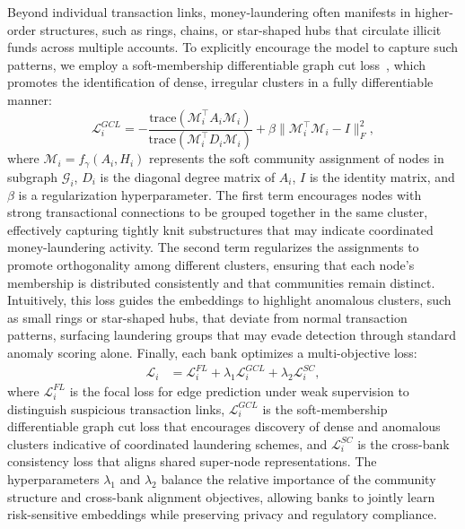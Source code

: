 \documentclass[11pt,english]{article}
\begin{document}
Beyond individual transaction links, money-laundering often manifests in higher-order structures, such as rings, chains, or star-shaped hubs that circulate illicit funds across multiple accounts. To explicitly encourage the model to capture such patterns, we employ a soft-membership differentiable graph cut loss~\parencite{nazi2019gap}, which promotes the identification of dense, irregular clusters in a fully differentiable manner:
\begin{equation}
\mathcal{L}_i^{GCL} = -\frac{\mathrm{trace}(\mathcal{M}_i^\top A_i \mathcal{M}_i)}{\mathrm{trace}(\mathcal{M}_i^\top D_i \mathcal{M}_i)} + \beta \|\mathcal{M}_i^\top \mathcal{M}_i - I\|_F^2,
\end{equation}
where $\mathcal{M}_i = f_\gamma(A_i, H_i)$ represents the soft community assignment of nodes in subgraph $\mathcal{G}_i$, $D_i$ is the diagonal degree matrix of $A_i$, $I$ is the identity matrix, and $\beta$ is a regularization hyperparameter. The first term encourages nodes with strong transactional connections to be grouped together in the same cluster, effectively capturing tightly knit substructures that may indicate coordinated money-laundering activity. The second term regularizes the assignments to promote orthogonality among different clusters, ensuring that each node’s membership is distributed consistently and that communities remain distinct. Intuitively, this loss guides the embeddings to highlight anomalous clusters, such as small rings or star-shaped hubs, that deviate from normal transaction patterns, surfacing laundering groups that may evade detection through standard anomaly scoring alone. Finally, each bank optimizes a multi-objective loss: 
\begin{align}
\label{overall_loss}
    \mathcal{L}_i &= \mathcal{L}_i^{FL} + \lambda_1 \mathcal{L}_i^{GCL} + \lambda_2 \mathcal{L}_i^{SC},
\end{align}
where $\mathcal{L}_i^{FL}$ is the focal loss for edge prediction under weak supervision to distinguish suspicious transaction links, $\mathcal{L}_i^{GCL}$ is the soft-membership differentiable graph cut loss that encourages discovery of dense and anomalous clusters indicative of coordinated laundering schemes, and $\mathcal{L}_i^{SC}$ is the cross-bank consistency loss that aligns shared super-node representations. The hyperparameters $\lambda_1$ and $\lambda_2$ balance the relative importance of the community structure and cross-bank alignment objectives, allowing banks to jointly learn risk-sensitive embeddings while preserving privacy and regulatory compliance.
\end{document}
